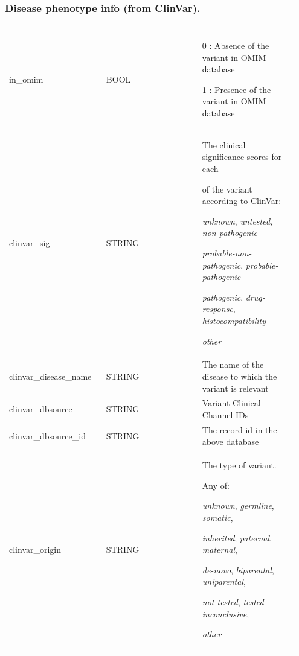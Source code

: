 \documentclass[letterpaper,10pt,english]{sphinxmanual}
\begin{document}
\subsubsection{Disease phenotype info (from ClinVar).}
\label{content/database_schema:disease-phenotype-info-from-clinvar}
\begin{tabular}{|p{0.317\linewidth}|p{0.317\linewidth}|p{0.317\linewidth}|}
\hline
\textbf{} & \textbf{} & \textbf{}\\\hline

in\_omim
 & 
BOOL
 & 
\begin{DUlineblock}{0em}
\item[] 0 : Absence of the variant in OMIM database
\item[] 1 : Presence of the variant in OMIM database
\end{DUlineblock}
\\\hline

clinvar\_sig
 & 
STRING
 & 
\begin{DUlineblock}{0em}
\item[] The clinical significance scores for each
\item[] of the variant according to ClinVar:
\item[] \emph{unknown}, \emph{untested}, \emph{non-pathogenic}
\item[] \emph{probable-non-pathogenic}, \emph{probable-pathogenic}
\item[] \emph{pathogenic}, \emph{drug-response}, \emph{histocompatibility}
\item[] \emph{other}
\end{DUlineblock}
\\\hline

clinvar\_disease\_name
 & 
STRING
 & 
The name of the disease to which the variant is relevant
\\\hline

clinvar\_dbsource
 & 
STRING
 & 
Variant Clinical Channel IDs
\\\hline

clinvar\_dbsource\_id
 & 
STRING
 & 
The record id in the above database
\\\hline

clinvar\_origin
 & 
STRING
 & 
\begin{DUlineblock}{0em}
\item[] The type of variant.
\item[] Any of:
\item[] \emph{unknown}, \emph{germline}, \emph{somatic},
\item[] \emph{inherited}, \emph{paternal}, \emph{maternal},
\item[] \emph{de-novo}, \emph{biparental}, \emph{uniparental},
\item[] \emph{not-tested}, \emph{tested-inconclusive},
\item[] \emph{other}
\end{DUlineblock}
\\\hline


\end{tabular}
\end{document}
